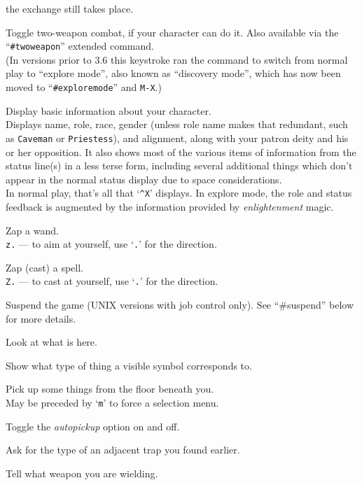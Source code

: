\documentclass[titlepage]{article}
\begin{document}
\begin{description}[font=\mdseries\ttfamily]
the exchange still takes place.
\item[X]
Toggle two-weapon combat, if your character can do it.  Also available
via the ``\texttt{\#twoweapon}'' extended command.\\
(In versions prior to 3.6 this keystroke ran the command to switch from normal
play to ``explore mode'', also known as ``discovery mode'', which has now
been moved to ``\texttt{\#exploremode}'' and \texttt{M-X}.)
\item[\textasciicircum X]
Display basic information about your character.\\
Displays name, role, race, gender (unless role name makes that
redundant, such as \texttt{Caveman} or \texttt{Priestess}), and alignment,
along with your patron deity and his or her opposition.  It also
shows most of the various items of information from the status line(s)
in a less terse form, including several additional things which don't
appear in the normal status display due to space considerations.\\
In normal play, that's all that `\texttt{\textasciicircum X}' displays.
In explore mode, the role and status feedback is augmented by the
information provided by \textit{enlightenment} magic.
\item[z]
Zap a wand.\\
\texttt{z.} --- to aim at yourself, use `\texttt{.}' for the direction.
\item[Z]
Zap (cast) a spell.\\
\texttt{Z.} --- to cast at yourself, use `\texttt{.}' for the direction.
\item[\textasciicircum Z]
Suspend the game (UNIX versions with job control only).
See ``\#suspend'' below for more details.
\item[:]
Look at what is here.
\item[;]
Show what type of thing a visible symbol corresponds to.
\item[,]
Pick up some things from the floor beneath you.\\
May be preceded by `\texttt{m}' to force a selection menu.
\item[@]
Toggle the \textit{autopickup} option on and off.
\item[\textasciicircum]
Ask for the type of an adjacent trap you found earlier.
\item[)]
Tell what weapon you are wielding.
\item[{]}]

\end{description}
\end{document}
